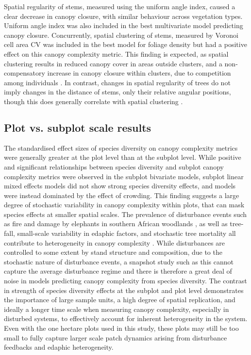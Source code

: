 \documentclass[11pt,a4paper]{article}
\begin{document}
Spatial regularity of stems, measured using the uniform angle index, caused a clear decrease in canopy closure, with similar behaviour across vegetation types. Uniform angle index was also included in the best multivariate model predicting canopy closure. Concurrently, spatial clustering of stems, measured by Voronoi cell area CV was included in the best model for foliage density but had a positive effect on this canopy complexity metric. This finding is expected, as spatial clustering results in reduced canopy cover in areas outside clusters, and a non-compensatory increase in canopy closure within clusters, due to competition among individuals \citep{Martens2000}. In contrast, changes in spatial regularity of trees do not imply changes in the distance of stems, only their relative angular positions, though this does generally correlate with spatial clustering \citep{Gadow2002}.

\subsection{Plot vs. subplot scale results}

The standardised effect sizes of species diversity on canopy complexity metrics were generally greater at the plot level than at the subplot level. While positive and significant relationships between species diversity and subplot canopy complexity metrics were observed in the subplot bivariate models, subplot linear mixed effects models did not show strong species diversity effects, and models were instead dominated by the effect of crowding. This finding suggests a large degree of stochastic variability in canopy complexity within plots, that can mask species effects at smaller spatial scales. The prevalence of disturbance events such as fire and damage by elephants in southern African woodlands \citep{Bond2008}, as well as tree-fall, small-scale variability in edaphic factors, and stochastic tree mortality all contribute to heterogeneity in canopy complexity \citep{Shirima2015}. While disturbances are controlled to some extent by stand structure and composition, due to the stochastic nature of disturbance events, a snapshot study such as this cannot capture the average disturbance regime and there is therefore a great deal of noise in models predicting canopy complexity from species diversity. The contrast in strength of species diversity effects at the subplot and plot level demonstrates the importance of large sample units, a high degree of spatial replication, and ideally a longer time scale when measuring canopy complexity, especially in disturbed systems, to effectively account for inherent heterogeneity in the system. Even with the one hectare plots used in this study, these plots may still be too small to fully capture larger scale patch dynamics arising from disturbance feedbacks and edaphic heterogeneity.
\end{document}
